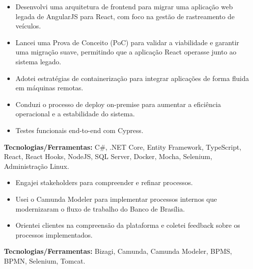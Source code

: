 \documentclass[10pt,a4paper]{altacv}
\begin{document}
\begin{itemize}
    \setlength{\itemindent}{0.5em}
    \item[--] Desenvolvi uma arquitetura de frontend para migrar uma aplicação web legada de AngularJS para React, com foco na gestão de rastreamento de veículos.
    \item[--] Lancei uma Prova de Conceito (PoC) para validar a viabilidade e garantir uma migração suave, permitindo que a aplicação React operasse junto ao sistema legado.
    \item[--] Adotei estratégias de containerização para integrar aplicações de forma fluida em máquinas remotas.
    \item[--] Conduzi o processo de deploy on-premise para aumentar a eficiência operacional e a estabilidade do sistema.
    \item[--] Testes funcionais end-to-end com Cypress.
\end{itemize}
\textbf{Tecnologias/Ferramentas:} C\#, .NET Core, Entity Framework, TypeScript, React, React Hooks, NodeJS, SQL Server, Docker, Mocha, Selenium, Administração Linux.
\vspace{5mm}

\begin{itemize}
    \setlength{\itemindent}{0.5em}
    \item[--] Engajei stakeholders para compreender e refinar processos.
    \item[--] Usei o Camunda Modeler para implementar processos internos que modernizaram o fluxo de trabalho do Banco de Brasília.
    \item[--] Orientei clientes na compreensão da plataforma e coletei feedback sobre os processos implementados.
\end{itemize}
\textbf{Tecnologias/Ferramentas:} Bizagi, Camunda, Camunda Modeler, BPMS, BPMN, Selenium, Tomcat.
\vspace{5mm}
\end{document}
